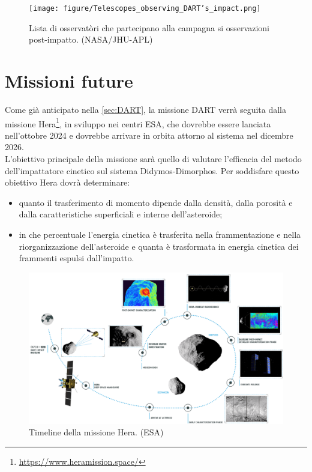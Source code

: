 \begin{figure}[!h]
    \centering
    \texttt{[image: figure/Telescopes\_observing\_DART's\_impact.png]}
    \caption[Osservatòri che hanno osservato l'impatto di DART.]{Lista di osservatòri che partecipano alla campagna si osservazioni post-impatto. (NASA/JHU-APL)}
    \label{fig:obs_dart}
\end{figure}

\section{Missioni future}\label{sec:hera}
Come già anticipato nella \cref{sec:DART}, la missione DART verrà seguita dalla missione Hera\footnote{\href{https://www.heramission.space/}{https://www.heramission.space/}}, in sviluppo nei centri ESA, che dovrebbe essere lanciata nell'ottobre 2024 e dovrebbe arrivare in orbita attorno al sistema nel dicembre 2026.\\
L'obiettivo principale della missione sarà quello di valutare l'efficacia del metodo dell'impattatore cinetico sul sistema Didymos-Dimorphos. Per soddisfare questo obiettivo Hera dovrà determinare: 
\begin{itemize}
    \item quanto il trasferimento di momento dipende dalla densità, dalla porosità e dalla caratteristiche superficiali e interne dell'asteroide;
    \item in che percentuale l'energia cinetica è trasferita nella frammentazione e nella riorganizzazione dell'asteroide e quanta è trasformata in energia cinetica dei frammenti espulsi dall'impatto.
\end{itemize}

\begin{figure}[!h]
    \centering
    \includegraphics[scale=0.50]{figure/Hera_mission_timeline.png}
    \caption[Timeline della missione Hera.]{Timeline della missione Hera. (ESA)}
    \label{fig:hera_timeline}
\end{figure}

